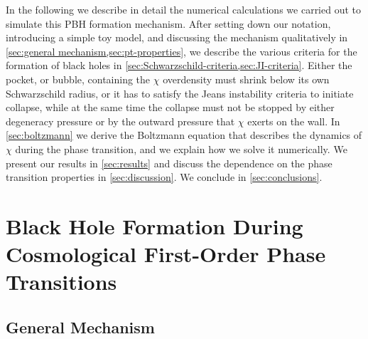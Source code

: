 \documentclass[
onecolumn, %
11pt, %
tightenlines,
superscriptaddress, %
nofootinbib, %
preprintnumbers, %
prd %
]{revtex4-1}
\begin{document}
In the following we describe in detail the numerical calculations we carried out to simulate this PBH formation mechanism. After setting down our notation, introducing a simple toy model, and discussing the mechanism qualitatively in \cref{sec:general mechanism,sec:pt-properties}, we describe the various criteria for the formation of black holes in \cref{sec:Schwarzschild-criteria,sec:JI-criteria}.  Either the pocket, or bubble, containing the $\chi$ overdensity must shrink below its own Schwarzschild radius, or it has to satisfy the Jeans instability criteria to initiate collapse, while at the same time the collapse must not be stopped by either degeneracy pressure or by the outward pressure that $\chi$ exerts on the wall.  In \cref{sec:boltzmann} we derive the Boltzmann equation that describes the dynamics of $\chi$ during the phase transition, and we explain how we solve it numerically.  We present our results in \cref{sec:results} and discuss the dependence on the phase transition properties in \cref{sec:discussion}. We conclude in \cref{sec:conclusions}.


\section{Black Hole Formation During Cosmological First-Order Phase Transitions}
\label{sec:mechanism}

\subsection{General Mechanism}
\label{sec:general mechanism}
\end{document}

